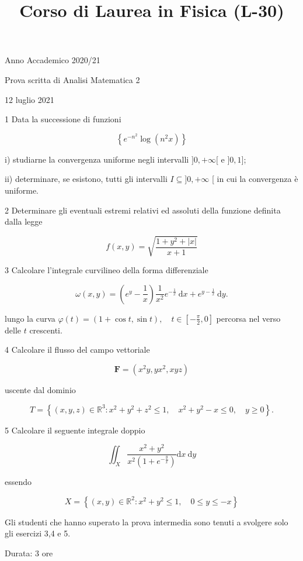 \documentclass[10pt]{article}
\title{Corso di Laurea in Fisica (L-30) }
\author{}
\date{}
\begin{document}
\maketitle
Anno Accademico 2020/21

Prova scritta di Analisi Matematica 2

12 luglio 2021

1 Data la successione di funzioni

\[
\left\{e^{-n^{2}} \log \left(n^{2} x\right)\right\}
\]

i) studiarne la convergenza uniforme negli intervalli \(] 0,+\infty[\) e \(] 0,1]\);

ii) determinare, se esistono, tutti gli intervalli \(I \subseteq] 0,+\infty\) [ in cui la convergenza è uniforme.

2 Determinare gli eventuali estremi relativi ed assoluti della funzione definita dalla legge

\[
f(x, y)=\sqrt{\frac{1+y^{2}+|x|}{x+1}}
\]

3 Calcolare l'integrale curvilineo della forma differenziale

\[
\omega(x, y)=\left(e^{y}-\frac{1}{x}\right) \frac{1}{x^{2}} e^{-\frac{1}{x}} \mathrm{~d} x+e^{y-\frac{1}{x}} \mathrm{~d} y .
\]

lungo la curva \(\varphi(t)=(1+\cos t, \sin t), \quad t \in\left[-\frac{\pi}{2}, 0\right]\) percorsa nel verso delle \(t\) crescenti.

4 Calcolare il flusso del campo vettoriale

\[
\mathbf{F}=\left(x^{2} y, y x^{2}, x y z\right)
\]

uscente dal dominio

\[
T=\left\{(x, y, z) \in \mathbb{R}^{3}: x^{2}+y^{2}+z^{2} \leq 1, \quad x^{2}+y^{2}-x \leq 0, \quad y \geq 0\right\} .
\]

5 Calcolare il seguente integrale doppio

\[
\iint_{X} \frac{x^{2}+y^{2}}{x^{2}\left(1+e^{-\frac{y}{x}}\right)} \mathrm{d} x \mathrm{~d} y
\]

essendo

\[
X=\left\{(x, y) \in \mathbb{R}^{2}: x^{2}+y^{2} \leq 1, \quad 0 \leq y \leq-x\right\}
\]

Gli studenti che hanno superato la prova intermedia sono tenuti a svolgere solo gli esercizi 3,4 e 5.

Durata: 3 ore
\end{document}
